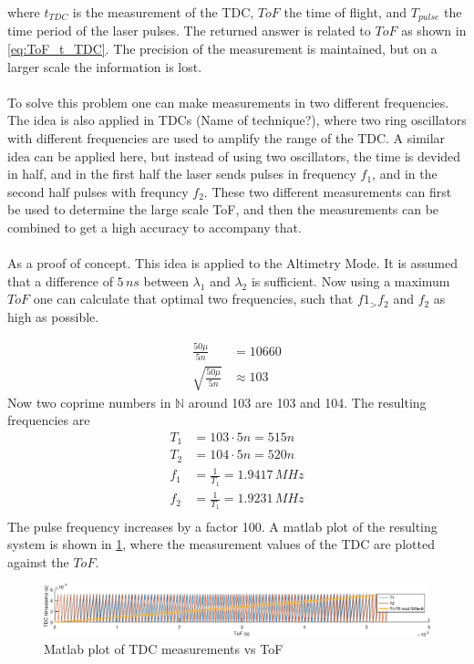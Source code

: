  where $t_{TDC}$ is the measurement of the TDC, $ToF$ the time of flight, and $T_{pulse}$ the time period of the laser pulses. The returned answer is related to $ToF$ as shown in \cref{eq:ToF_t_TDC}. The precision of the measurement is maintained,  but on a larger scale the information is lost. \\
 \\
To solve this problem one can make measurements in two different frequencies. The idea is also applied in TDCs (Name of technique?), where two ring oscillators with different frequencies are used to amplify the range of the TDC. A similar idea can be applied here, but instead of using two oscillators, the time is devided in half, and in the first half the laser sends pulses in frequency $f_1$, and in the second half pulses with frequncy $f_2$. These two different measurements can first be used to determine the large scale ToF, and then the measurements can be combined to get a high accuracy to accompany that.\\
\\
As a proof of concept. This idea is applied to the Altimetry Mode. It is assumed that a difference of $5\,ns$ between $\lambda_1$ and $\lambda_2$ is sufficient. Now using a maximum $ToF$ one can calculate that optimal two frequencies, such that $f1_>f_2$ and $f_2$ as high as possible. 

\begin{align}
 	\frac{50\mu}{5n} &= 10660\\ 
 	\sqrt{\frac{50\mu}{5n}} &\approx 103
 \end{align} 
 Now two coprime numbers in $\mathbb{N}$ around 103 are 103 and 104. The resulting frequencies are
 \begin{align}
 	T_1 &= 103\cdot5n = 515n\\
 	T_2 &= 104\cdot5n = 520n\\
 	f_1 &= \frac{1}{T_1} = 1.9417\,MHz\\
 	f_2 &= \frac{1}{T_1} = 1.9231\,MHz\\
 \end{align}
The pulse frequency increases by a factor 100. A matlab plot of the resulting system is shown in \cref{fig:frequency_hopping}, where the measurement values of the TDC are plotted against the $ToF$.


\begin{figure}[h]
    \centering
    \includegraphics[width=\textwidth]{fig/frequency_hopping.eps}
    \caption{Matlab plot of TDC measurements vs ToF}
    \label{fig:frequency_hopping}
\end{figure}

